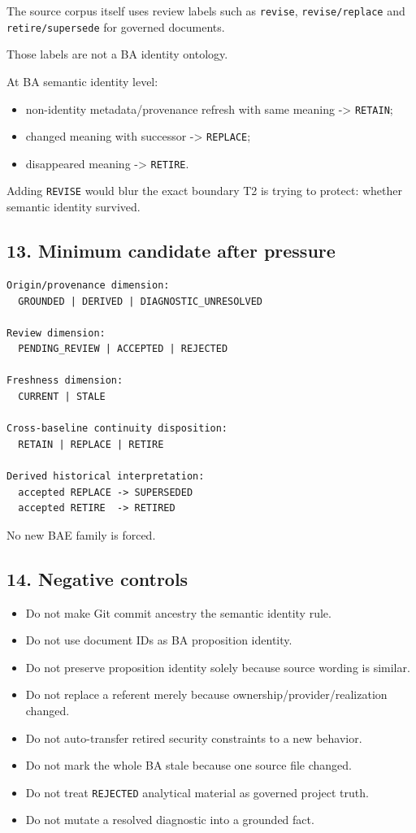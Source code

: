 \documentclass[11pt,a4paper]{article}
\providecommand{\tightlist}{\setlength{\itemsep}{0pt}\setlength{\parskip}{0pt}}\setlength{\emergencystretch}{4em}\hbadness=10000\hfuzz=20pt\sloppy
\begin{document}
The source corpus itself uses review labels such as \texttt{revise},
\texttt{revise/replace} and \texttt{retire/supersede} for governed
documents.

Those labels are not a BA identity ontology.

At BA semantic identity level:

\begin{itemize}
\tightlist
\item
  non-identity metadata/provenance refresh with same meaning
  -\textgreater{} \texttt{RETAIN};
\item
  changed meaning with successor -\textgreater{} \texttt{REPLACE};
\item
  disappeared meaning -\textgreater{} \texttt{RETIRE}.
\end{itemize}

Adding \texttt{REVISE} would blur the exact boundary T2 is trying to
protect: whether semantic identity survived.

\subsection{13. Minimum candidate after
pressure}\label{minimum-candidate-after-pressure}

\begin{verbatim}
Origin/provenance dimension:
  GROUNDED | DERIVED | DIAGNOSTIC_UNRESOLVED

Review dimension:
  PENDING_REVIEW | ACCEPTED | REJECTED

Freshness dimension:
  CURRENT | STALE

Cross-baseline continuity disposition:
  RETAIN | REPLACE | RETIRE

Derived historical interpretation:
  accepted REPLACE -> SUPERSEDED
  accepted RETIRE  -> RETIRED
\end{verbatim}

No new BAE family is forced.

\subsection{14. Negative controls}\label{negative-controls}

\begin{itemize}
\tightlist
\item
  Do not make Git commit ancestry the semantic identity rule.
\item
  Do not use document IDs as BA proposition identity.
\item
  Do not preserve proposition identity solely because source wording is
  similar.
\item
  Do not replace a referent merely because
  ownership/provider/realization changed.
\item
  Do not auto-transfer retired security constraints to a new behavior.
\item
  Do not mark the whole BA stale because one source file changed.
\item
  Do not treat \texttt{REJECTED} analytical material as governed project
  truth.
\item
  Do not mutate a resolved diagnostic into a grounded fact.
\end{itemize}
\end{document}
